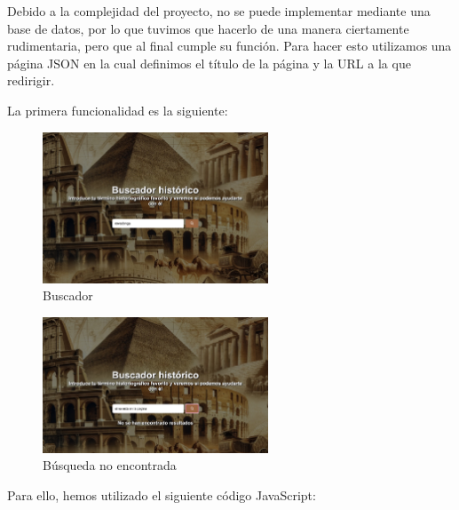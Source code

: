 \documentclass{article}
\begin{document}
Debido a la complejidad del proyecto, no se puede implementar mediante una base de datos, por lo que tuvimos que hacerlo de una manera ciertamente rudimentaria, pero que al final cumple su función. Para hacer esto utilizamos una página JSON en la cual definimos el título de la página y la URL a la que redirigir.

La primera funcionalidad es la siguiente:

\begin{figure}[H]
    \centering
    \includegraphics[width=0.6\textwidth]{jsFotos/buscador.jpg}
    \caption{Buscador}
    \label{fig:foro_interface}
\end{figure}

\begin{figure}[H]
    \centering
    \includegraphics[width=0.6\textwidth]{jsFotos/buscadorNoEncontrado.jpg}
    \caption{Búsqueda no encontrada}
    \label{fig:foro_interface}
\end{figure}

\newpage

Para ello, hemos utilizado el siguiente código JavaScript:
\end{document}
